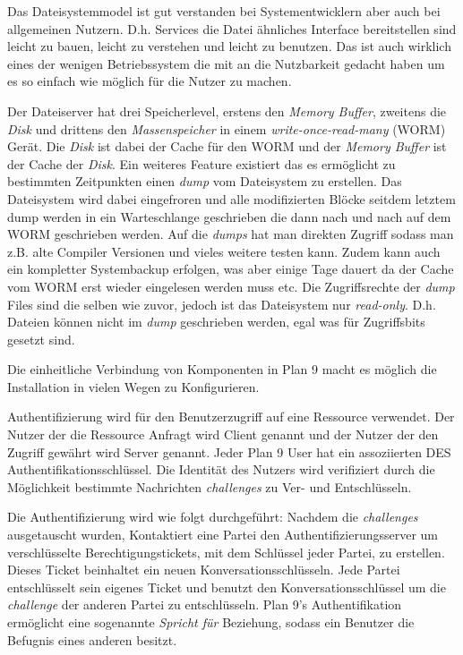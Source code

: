 \documentclass[11pt,technote]{IEEEtran}
\begin{document}
        Das Dateisystemmodel ist gut verstanden bei Systementwicklern aber auch bei allgemeinen Nutzern. 
        D.h. Services die Datei \"ahnliches Interface bereitstellen sind leicht zu bauen, leicht zu verstehen
        und leicht zu benutzen. Das ist auch wirklich eines der wenigen Betriebssystem die mit an die Nutzbarkeit
        gedacht haben um es so einfach wie m\"oglich f\"ur die Nutzer zu machen.
        
        Der Dateiserver hat drei Speicherlevel, erstens den \textit{Memory Buffer}, zweitens die \textit{Disk} und drittens den \textit{Massenspeicher}
        in einem \textit{write-once-read-many} (WORM) Ger\"at. 
        Die \textit{Disk} ist dabei der Cache f\"ur den WORM und der \textit{Memory Buffer} ist der Cache der \textit{Disk}.
        Ein weiteres Feature existiert das es erm\"oglicht zu bestimmten Zeitpunkten einen \textit{dump} vom
        Dateisystem zu erstellen. Das Dateisystem wird dabei eingefroren und alle modifizierten Bl\"ocke seitdem letztem dump werden in ein Warteschlange geschrieben
        die dann nach und nach auf dem WORM geschrieben werden. Auf die \textit{dumps} hat man direkten Zugriff sodass man z.B. alte Compiler Versionen
        und vieles weitere testen kann.
        Zudem kann auch ein kompletter Systembackup erfolgen, was aber einige Tage dauert da der Cache vom WORM erst wieder eingelesen werden muss etc.
        Die Zugriffsrechte der \textit{dump} Files sind die selben wie zuvor, jedoch ist das Dateisystem nur \textit{read-only}.
        D.h. Dateien k\"onnen nicht im \textit{dump} geschrieben werden, egal was f\"ur Zugriffsbits gesetzt sind.
        
        Die einheitliche Verbindung von Komponenten in Plan 9 macht es m\"oglich die Installation in vielen Wegen zu Konfigurieren.
        
        Authentifizierung wird f\"ur den Benutzerzugriff auf eine Ressource verwendet. Der Nutzer der die Ressource Anfragt wird Client genannt und der
        Nutzer der den Zugriff gew\"ahrt wird Server genannt. Jeder Plan 9 User hat ein assoziierten DES Authentifikationsschl\"ussel. Die Identit\"at
        des Nutzers wird verifiziert durch die M\"oglichkeit bestimmte Nachrichten \textit{challenges} zu Ver- und Entschl\"usseln.
        
        Die Authentifizierung wird wie folgt durchgef\"uhrt: Nachdem die \textit{challenges} ausgetauscht wurden, 
        Kontaktiert eine Partei den Authentifizierungsserver um verschl\"usselte Berechtigungstickets, 
        mit dem Schl\"ussel jeder Partei, zu erstellen. Dieses Ticket beinhaltet ein neuen Konversationsschl\"usseln.
        Jede Partei entschl\"usselt sein eigenes Ticket und benutzt den Konversationsschl\"ussel um die \textit{challenge} der anderen Partei zu entschl\"usseln.     
        Plan 9's Authentifikation erm\"oglicht eine sogenannte \textit{Spricht f\"ur} Beziehung, sodass ein Benutzer die Befugnis eines anderen besitzt.
        
\end{document}
